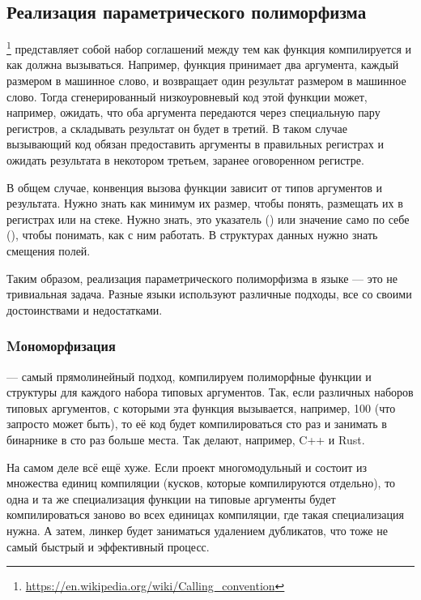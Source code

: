 \subsection{Реализация параметрического полиморфизма}

\footnote{\url{https://en.wikipedia.org/wiki/Calling_convention}} представляет собой набор соглашений между тем как функция компилируется и как должна вызываться.
Например, функция принимает два аргумента, каждый размером в машинное слово, и возвращает один результат размером в машинное слово.
Тогда сгенерированный низкоуровневый код этой функции может, например, ожидать, что оба аргумента передаются через специальную пару регистров, а складывать результат он будет в третий.
В таком случае вызывающий код обязан предоставить аргументы в правильных регистрах и ожидать результата в некотором третьем, заранее оговоренном регистре.

В общем случае, конвенция вызова функции зависит от типов аргументов и результата.
Нужно знать как минимум их размер, чтобы понять, размещать их в регистрах или на стеке.
Нужно знать, это указатель () или значение само по себе (), чтобы понимать, как с ним работать.
В структурах данных нужно знать смещения полей.

Таким образом, реализация параметрического полиморфизма в языке --- это не тривиальная задача.
Разные языки используют различные подходы, все со своими достоинствами и недостатками.

\subsubsection{Mономорфизация} \label{subsubsec:monomorphization}

 --- самый прямолинейный подход, компилируем полиморфные функции и структуры для каждого набора типовых аргументов.
Так, если различных наборов типовых аргументов, с которыми эта функция вызывается, например, 100 (что запросто может быть), то её код будет компилироваться сто раз и занимать в бинарнике в сто раз больше места.
Так делают, например, C++ и Rust.

На самом деле всё ещё хуже.
Если проект многомодульный и состоит из множества единиц компиляции (кусков, которые компилируются отдельно), то одна и та же специализация функции на типовые аргументы будет компилироваться заново во всех единицах компиляции, где такая специализация нужна.
А затем, линкер будет заниматься удалением дубликатов, что тоже не самый быстрый и эффективный процесс.

